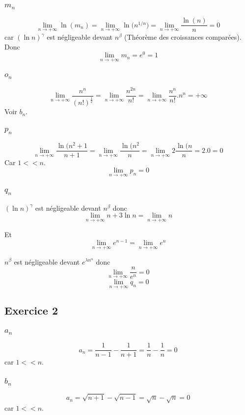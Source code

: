 \documentclass[]{book}
\theoremstyle{definition}
\begin{document}
\subsubsection*{$m_n$}
$$\lim_{n \to +\infty}{\ln(m_n)} = \lim_{n \to +\infty}{\ln(n^{1/n}}) = \lim_{n \to +\infty}{\frac{\ln(n)}{n}} = 0$$
car $(\ln n)^{\gamma}$ est n\'egligeable devant $n^{\beta}$ (Th\'eor\`eme des croissances compar\'ees). Donc
$$\lim_{n \to +\infty}{m_n} = e^0 = 1$$
 

\subsubsection*{$o_n$}
$$\lim_{n \to +\infty}{\frac{n^n}{(n!)^{\frac{1}{2}}}} = \lim_{n \to +\infty}{\frac{n^{2n}}{n!}} = \lim_{n \to +\infty}{\frac{n^n}{n!}.n^n} = +\infty$$
Voir $b_n$.

\subsubsection*{$p_n$}
$$\lim_{n \to +\infty}{\frac{\ln(n^2+1}{n+1}} = \lim_{n \to +\infty}{\frac{\ln(n^2}{n}} = \lim_{n \to +\infty}{2\frac{\ln(n}{n}} = 2.0 = 0$$
Car $1 << n$.
$$\lim_{n \to +\infty}{p_n} = 0$$

\subsubsection*{$q_n$}
$(\ln n)^{\gamma}$ est n\'egligeable devant $n^{\beta}$ donc
$$\lim_{n \to +\infty}{n + 3\ln n} = \lim_{n \to +\infty}{n}$$

Et
$$\lim_{n \to +\infty}{e^{n-1}} = \lim_{n \to +\infty}{e^{n}}$$

$n^{\beta}$ est n\'egligeable devant $e^{\lambda n^{\alpha}}$ donc
$$\lim_{n \to +\infty}{\frac{n}{e^{n}}} = 0$$
$$\lim_{n \to +\infty}{q_n} = 0$$


\subsection*{Exercice 2}
\subsubsection*{$a_n$}
$$a_n = \frac{1}{n-1}-\frac{1}{n+1} = \frac{1}{n}-\frac{1}{n} = 0$$
car $1 << n$.

\subsubsection*{$b_n$}
$$a_n = \sqrt{n+1}-\sqrt{n-1} = \sqrt{n}-\sqrt{n} = 0$$
car $1 << n$.
\end{document}
